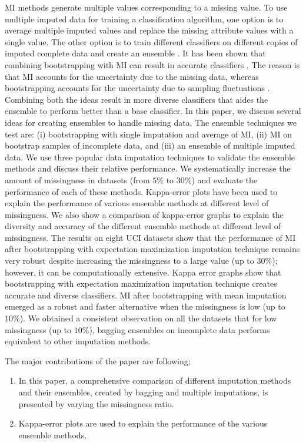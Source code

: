 \documentclass{iosart2c}
\begin{document}
MI methods generate multiple values corresponding to a missing value. To use multiple imputed data for training a classification algorithm, one option is to average multiple imputed values and replace the missing attribute values with a single value. The other option is to train different classifiers on different copies of imputed complete data and create an ensemble \cite{khan2012bayesian}. It has been shown that combining bootstrapping with MI can result in accurate classifiers \cite{wu2013new}. The reason is that MI accounts for the uncertainty due to the missing data, whereas bootstrapping accounts for the uncertainty due to sampling fluctuations \cite{wu2013new}. Combining both the ideas result in more diverse classifiers that aides the ensemble to perform better than a base classifier. In this paper, we discuss several ideas for creating ensembles to handle missing data. The ensemble techniques we test are: (i) bootstrapping with single imputation and average of MI, (ii) MI on bootstrap samples of incomplete data, and (iii) an ensemble of multiple imputed data. We use three popular data imputation techniques to validate the ensemble methods and discuss their relative performance. We systematically increase the amount of missingness in datasets (from $5\%$ to $30\%$) and evaluate the performance of each of these methods. Kappa-error plots \cite{Kappa} have been used to explain the performance of various ensemble methods at different level of missingness. We also show a comparison of kappa-error graphs to explain the diversity and accuracy of the different ensemble methods at different level of missingness. The results on eight UCI datasets \cite{Lichman:2013} show that the performance of MI after bootstrapping with expectation maximization imputation technique remains very robust despite increasing the missingness to a large value (up to $30\%$); however, it can be computationally extensive. Kappa error graphs show that bootstrapping with expectation maximization imputation technique creates accurate and diverse classifiers. MI after bootstrapping with mean imputation emerged as a robust and faster alternative when the missingness is low (up to $10\%$). We obtained a consistent observation on all the datasets that for low missingness (up to $10\%$), bagging ensembles on incomplete data performs equivalent to other imputation methods.

The major contributions of the paper are following;
\begin{enumerate}
\item  In this paper, a comprehensive comparison of different imputation methods and their ensembles, created by bagging and multiple imputations, is presented by varying the missingness ratio.
\item Kappa-error plots are used to explain the performance of the various ensemble methods.
\end{enumerate}
\end{document}
